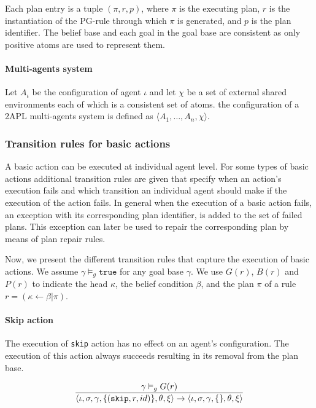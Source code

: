 \documentclass[a4paper]{article}
\begin{document}
Each plan entry is a tuple $(\pi, r, p)$, where $\pi$ is the executing plan, $r$ is the instantiation of the PG-rule through  which $\pi$ is generated, and $p$ is the plan identifier. The belief base and each goal in the goal base are consistent as only positive atoms are used to represent them.

\paragraph{Multi-agents system}

Let $A_{\iota}$ be the configuration of agent $\iota$ and let $\chi$ be a set of external shared environments each of which is a consistent set of atoms. the configuration of a 2APL multi-agents system is defined as $ \langle A_{1}, \ldots, A_{n}, \chi \rangle $.

\subsubsection{Transition rules for basic actions}

A basic action can be executed at individual agent level. For some types of basic actions additional transition rules are given that specify when an action's execution fails and which transition an individual agent should make if the execution of the action fails. In general when the execution of a basic action fails, an exception with its corresponding plan identifier, is added to the set of failed plans. This exception can later be used to repair the corresponding plan by means of plan repair rules.

Now, we present the different transition rules that capture the execution of basic actions. We assume $\gamma \vDash_{g} \texttt{true}$ for any goal base $\gamma$. We use $G(r)$, $B(r)$ and $P(r)$ to indicate the head $\kappa$, the belief condition $\beta$, and the plan $\pi$ of a rule $ r = (\kappa \leftarrow \beta \vert \pi)$.

\paragraph{Skip action}

The execution of \texttt{skip} action has no effect on an agent's configuration. The execution of
this action always succeeds resulting in its removal from the plan base.

$$ {{\gamma \vDash_{g} G(r)}\over{\langle \iota, \sigma, \gamma, \{(\texttt{skip}, r, id)\}, \theta, \xi \rangle  \rightarrow \langle \iota, \sigma, \gamma, \{\}, \theta, \xi \rangle}}$$
\end{document}
